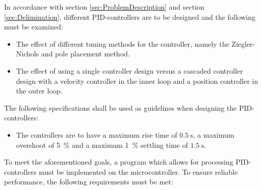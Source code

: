 \documentclass[../../main.tex]{subfiles}
\begin{document}
In accordance with section \ref{sec:ProblemDescription} and section \ref{sec:Delimination}, different PID-controllers are to be designed and the following must be examined:
\begin{itemize}
    \item The effect of different tuning methods for the controller, namely the Ziegler-Nichols and pole placement method.
    \item The effect of using a single controller design versus a cascaded controller design with a velocity controller in the inner loop and a position controller in the outer loop.
\end{itemize}

The following specifications shall be used as guidelines
when designing the PID-controllers:
\begin{itemize}
    \item The controllers are to have a maximum rise time of $\SI{0.5}{\second}$, a maximum overshoot of \SI{5}{\percent} and a maximum \SI{1}{\percent} settling time of $\SI{1.5}{\second}$.
\end{itemize}

To meet the aforementioned goals, a program which allows for processing PID-controllers must be implemented on the microcontroller. To ensure reliable performance, the following requirements must be met:
\end{document}
